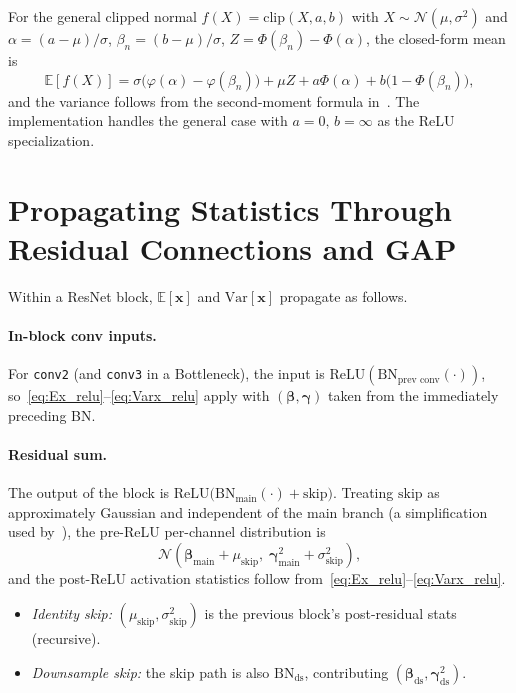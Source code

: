 \documentclass[11pt,a4paper]{article}
\newcommand{\xx}{\mathbf{x}}
\newcommand{\bgam}{\boldsymbol{\gamma}}
\newcommand{\bbet}{\boldsymbol{\beta}}
\newcommand{\E}{\mathbb{E}}
\newcommand{\Var}{\mathrm{Var}}
\newcommand{\norm}[1]{\mathcal{N}\!\left(#1\right)}
\begin{document}
For the general clipped normal $f(X) = \mathrm{clip}(X, a, b)$ with $X \sim \norm{\mu,\sigma^2}$ and $\alpha = (a-\mu)/\sigma$, $\beta_n=(b-\mu)/\sigma$, $Z = \Phi(\beta_n)-\Phi(\alpha)$, the closed-form mean is
\begin{equation}
\E[f(X)] = \sigma\bigl(\varphi(\alpha)-\varphi(\beta_n)\bigr) + \mu Z + a\Phi(\alpha) + b\bigl(1 - \Phi(\beta_n)\bigr),
\end{equation}
and the variance follows from the second-moment formula in~\cite[App.~C]{nagel2019}. The implementation handles the general case with $a=0,\,b=\infty$ as the ReLU specialization.

\section{Propagating Statistics Through Residual Connections and GAP}
\label{sec:residual}

Within a ResNet block, $\E[\xx]$ and $\Var[\xx]$ propagate as follows.

\paragraph{In-block conv inputs.} For \texttt{conv2} (and \texttt{conv3} in a Bottleneck), the input is $\mathrm{ReLU}(\mathrm{BN}_{\text{prev conv}}(\cdot))$, so~\eqref{eq:Ex_relu}--\eqref{eq:Varx_relu} apply with $(\bbet,\bgam)$ taken from the immediately preceding BN.

\paragraph{Residual sum.} The output of the block is $\mathrm{ReLU}\bigl(\mathrm{BN}_{\text{main}}(\cdot) + \text{skip}\bigr)$. Treating $\text{skip}$ as approximately Gaussian and independent of the main branch (a simplification used by~\cite{nagel2019}), the pre-ReLU per-channel distribution is
\begin{equation}
\norm{\bbet_{\text{main}} + \mu_{\text{skip}},\;\bgam_{\text{main}}^2 + \sigma_{\text{skip}}^2},
\end{equation}
and the post-ReLU activation statistics follow from~\eqref{eq:Ex_relu}--\eqref{eq:Varx_relu}.
\begin{itemize}
\item \emph{Identity skip:} $(\mu_{\text{skip}}, \sigma_{\text{skip}}^2)$ is the previous block's post-residual stats (recursive).
\item \emph{Downsample skip:} the skip path is also $\mathrm{BN}_{\text{ds}}$, contributing $(\bbet_{\text{ds}},\bgam_{\text{ds}}^2)$.
\end{itemize}
\end{document}
